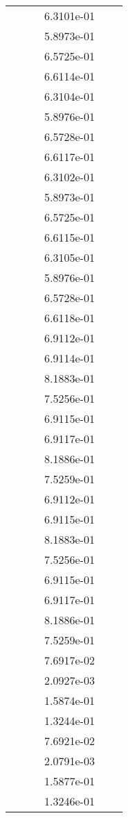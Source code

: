 \begin{xltabular}{\textwidth}{r|rS[table-format=1.3e+2]S[table-format=1.4e+2]S[table-format=1.4e+2]S[table-format=-1.5]}
&  &  & 6.3101e-01 & & \\
&  &  & 5.8973e-01 & & \\
&  &  & 6.5725e-01 & & \\
&  &  & 6.6114e-01 & & \\
&  &  & 6.3104e-01 & & \\
&  &  & 5.8976e-01 & & \\
&  &  & 6.5728e-01 & & \\
&  &  & 6.6117e-01 & & \\
&  &  & 6.3102e-01 & & \\
&  &  & 5.8973e-01 & & \\
&  &  & 6.5725e-01 & & \\
&  &  & 6.6115e-01 & & \\
&  &  & 6.3105e-01 & & \\
&  &  & 5.8976e-01 & & \\
&  &  & 6.5728e-01 & & \\
&  &  & 6.6118e-01 & & \\
&  &  & 6.9112e-01 & & \\
&  &  & 6.9114e-01 & & \\
&  &  & 8.1883e-01 & & \\
&  &  & 7.5256e-01 & & \\
&  &  & 6.9115e-01 & & \\
&  &  & 6.9117e-01 & & \\
&  &  & 8.1886e-01 & & \\
&  &  & 7.5259e-01 & & \\
&  &  & 6.9112e-01 & & \\
&  &  & 6.9115e-01 & & \\
&  &  & 8.1883e-01 & & \\
&  &  & 7.5256e-01 & & \\
&  &  & 6.9115e-01 & & \\
&  &  & 6.9117e-01 & & \\
&  &  & 8.1886e-01 & & \\
&  &  & 7.5259e-01 & & \\
&  &  & 7.6917e-02 & & \\
&  &  & 2.0927e-03 & & \\
&  &  & 1.5874e-01 & & \\
&  &  & 1.3244e-01 & & \\
&  &  & 7.6921e-02 & & \\
&  &  & 2.0791e-03 & & \\
&  &  & 1.5877e-01 & & \\
&  &  & 1.3246e-01 & & \\

\end{xltabular}
